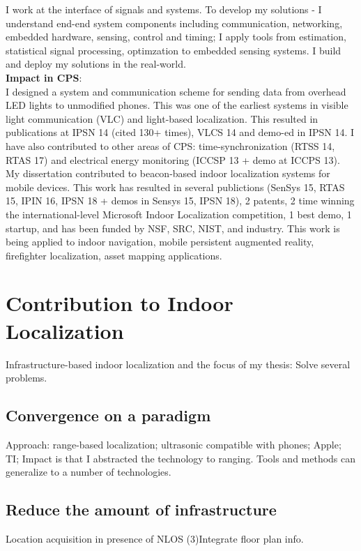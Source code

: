 \documentclass[10pt]{article}
\begin{document}
I work at the interface of signals and systems. To develop my solutions - I understand end-end system components including communication, networking, embedded hardware, sensing, control and timing; I apply tools from estimation, statistical signal processing, optimzation to embedded sensing systems. I build and deploy my solutions in the real-world. \\ 

\textbf{Impact in CPS}:\\
I designed a system and communication scheme for sending data from overhead LED lights to unmodified phones. This was one of the earliest systems in visible light communication (VLC) and light-based localization. This resulted in publications at IPSN 14 (cited 130+ times), VLCS 14 and demo-ed in IPSN 14. %
I have also contributed to other areas of CPS: time-synchronization (RTSS 14, RTAS 17) and electrical energy monitoring (ICCSP 13 + demo at ICCPS 13). My dissertation contributed to beacon-based indoor localization systems for mobile devices. This work has resulted in several publictions (SenSys 15, RTAS 15, IPIN 16, IPSN 18 + demos in Sensys 15, IPSN 18), 2 patents, 2 time winning the international-level Microsoft Indoor Localization competition, 1 best demo, 1 startup, and has been funded by NSF, SRC, NIST, and industry. This work is being applied to indoor navigation, mobile persistent augmented reality, firefighter localization, asset mapping applications. 

\section{Contribution to Indoor Localization}
Infrastructure-based indoor localization and the focus of my thesis:
Solve several problems.

\subsection{ Convergence on a paradigm }
Approach: range-based localization; ultrasonic compatible with phones; Apple; TI; 
Impact is that I abstracted the technology to ranging. Tools and methods can generalize to a number of technologies.

\subsection{Reduce the amount of infrastructure}
Location acquisition in presence of NLOS
(3)Integrate floor plan info.
\end{document}
